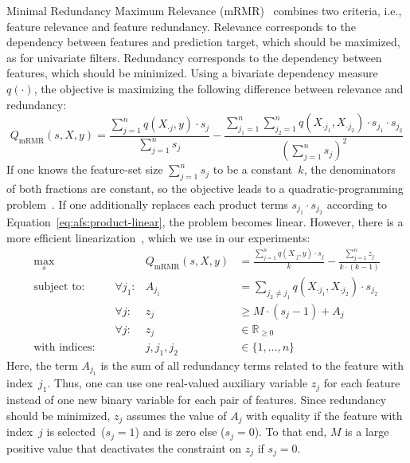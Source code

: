 \documentclass{article}
\theoremstyle{definition}
\begin{document}
Minimal Redundancy Maximum Relevance (mRMR)~\cite{peng2005feature} combines two criteria, i.e., feature relevance and feature redundancy.
Relevance corresponds to the dependency between features and prediction target, which should be maximized, as for univariate filters.
Redundancy corresponds to the dependency between features, which should be minimized.
Using a bivariate dependency measure~$q(\cdot)$, the objective is maximizing the following difference between relevance and redundancy:
%
\begin{equation}
	Q_{\text{mRMR}}(s,X,y) = \frac{\sum_{j=1}^{n} q(X_{\cdot{}j},y) \cdot s_j}{\sum_{j=1}^{n} s_j} - \frac{\sum_{j_1=1}^{n} \sum_{j_2=1}^{n} q(X_{\cdot{}j_1}, X_{\cdot{}j_2}) \cdot s_{j_1} \cdot s_{j_2}}{(\sum_{j=1}^{n} s_j)^2}
	\label{eq:afs:mrmr}
\end{equation}
%
If one knows the feature-set size $\sum_{j=1}^{n} s_j$ to be a constant~$k$, the denominators of both fractions are constant, so the objective leads to a quadratic-programming problem~\cite{nguyen2014effective, rodriguez2010quadratic}.
If one additionally replaces each product terms $s_{j_1} \cdot s_{j_2}$ according to Equation~\ref{eq:afs:product-linear}, the problem becomes linear.
However, there is a more efficient linearization~\cite{nguyen2009optimizing, nguyen2010towards}, which we use in our experiments:
%
\begin{equation}
	\begin{aligned}
		\max_s &\quad & Q_{\text{mRMR}}(s,X,y) &= \frac{\sum_{j=1}^{n} q(X_{\cdot{}j},y) \cdot s_j}{k} - \frac{\sum_{j=1}^{n} z_j}{k \cdot (k-1)} \\
		\text{subject to:} &\quad \forall j_1: & A_{j_1} &= \sum_{j_2 \neq j_1} q(X_{\cdot{}j_1}, X_{\cdot{}j_2}) \cdot s_{j_2} \\
		&\quad \forall j: & z_j &\geq M \cdot (s_j - 1) + A_j \\
		&\quad \forall j: & z_j &\in \mathbb{R}_{\geq 0} \\
		\text{with indices:} &\quad & j, j_1, j_2 &\in \{1, \dots, n\}
	\end{aligned}
	\label{eq:afs:mrmr-linear}
\end{equation}
%
Here, the term $A_{j_1}$ is the sum of all redundancy terms related to the feature with index~$j_1$.
Thus, one can use one real-valued auxiliary variable $z_j$ for each feature instead of one new binary variable for each pair of features.
Since redundancy should be minimized, $z_j$ assumes the value of $A_j$ with equality if the feature with index~$j$ is selected~($s_j=1$) and is zero else ($s_j=0$).
To that end, $M$ is a large positive value that deactivates the constraint on $z_j$ if $s_j=0$.
\end{document}
